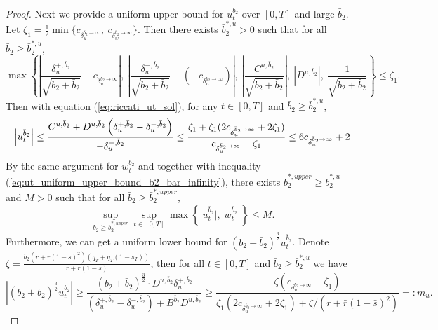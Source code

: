 \documentclass[11pt]{article}
\begin{document}
\begin{proof}
	Next we provide a uniform upper bound for $u_t^{\bar{b}_2}$ over $[0,T]$ and large $\bar{b}_2$. Let $\zeta_1 = \frac{1}{2} \min \{ c_{\delta_u^{\bar{b}_2 \to \infty}}, \  c_{\delta_w^{\bar{b}_2 \to \infty} } \}$. Then there exists $\bar{b}_2^{*,u} >0 $ such that for all $\bar{b}_2 \geq \bar{b}_2^{*,u}$,
	$$ \max\left\{ \left\vert \frac{\delta_u^{+,\bar{b}_2}}{\sqrt{b_2 + \bar{b}_2}} - c_{\delta^{\bar{b}_2 \to \infty}_u} \right\vert , \ \left\vert \frac{\delta_u^{-,\bar{b}_2}}{\sqrt{b_2 + \bar{b}_2}} - (-c_{\delta^{\bar{b}_2 \to \infty}_u})\right\vert,\    \left\vert \frac{C^{u,\bar{b}_2}}{\sqrt{b_2 + \bar{b}_2}} \right\vert, \   \left\vert D^{u,\bar{b}_2} \right\vert, \  \frac{1}{\sqrt{b_2 + \bar{b}_2}}  \right\} \leq \zeta_1. $$ 
	Then with equation (\ref{eq:riccati_ut_sol}), for any $t \in [0,T]$ and $\bar{b}_2 \geq \bar{b}_2^{*,u}$,
	\begin{equation}
		\left\vert u_t^{\bar{b}_2} \right\vert 
		\leq \frac{C^{u,\bar{b}_2}+ D^{u,\bar{b}_2} \left(\delta_u^{+,\bar{b}_2} - \delta_u^{-,\bar{b}_2} \right)}{- \delta_u^{-,\bar{b}_2}} \\
		\leq  \frac{\zeta_1 + \zeta_1 (2 c_{\delta_u^{\bar{b}_2 \to \infty}} + 2 \zeta_1)}{ c_{\delta_u^{\bar{b}_2 \to \infty}} - \zeta_1} \leq 6 c_{\delta_u^{\bar{b}_2 \to \infty}} + 2
	\label{eq:ut_uniform_upper_bound_b2_bar_infinity}
	\end{equation}
	By the same argument for $w_t^{b_2}$ and together with inequality (\ref{eq:ut_uniform_upper_bound_b2_bar_infinity}), there exists $\bar{b}_2^{*,upper} \geq \bar{b}_2^{*,u}$ and $M>0$ such that for all $\bar{b}_2 \geq \bar{b}_2^{*,upper}$, 
	\begin{equation}
	 \sup_{\bar{b}_2 \geq \bar{b}_2^{*,upper}} \sup_{t \in [0,T]} \max \left\{ \vert u_t^{\bar{b}_2}\vert, \vert w_t^{\bar{b}_2} \vert \right\} \leq M.
	 \label{eq:ut_wt_uniform_upper_bound_b2_bar_infty}
	\end{equation}
	Furthermore, we can get a uniform lower bound for $(b_2 + \bar{b}_2)^{\frac{3}{2}} u_t^{\bar{b}_2}$. Denote $\zeta = \frac{b_2 (r + \bar{r}(1-\bar{s})^2) (q_T + \bar{q}_T(1-s_T))}{r + \bar{r}(1-s)}$, then for all $t \in [0,T]$ and $\bar{b}_2 \geq \bar{b}_2^{*,u}$ we have
	\begin{equation}
		\left\vert (b_2 + \bar{b}_2)^{\frac{3}{2}} u_t^{\bar{b}_2} \right\vert \geq    \frac{ (b_2 + \bar{b}_2)^{\frac{3}{2}} \cdot D^{u,\bar{b}_2} \delta_u^{+,\bar{b}_2}}{(\delta_u^{+,\bar{b}_2} - \delta_u^{-,\bar{b}_2}) + B^{\bar{b}_2} D^{u,\bar{b}_2} } 
		\geq  \frac{\zeta (c_{\delta_u^{\bar{b}_2 \to \infty}} - \zeta_1)}{ \zeta_1 (2 c_{\delta_u^{\bar{b}_2 \to \infty}} + 2 \zeta_1) + \zeta / (r+ \bar{r}(1-\bar{s})^2) } =: m_u.
	\label{eq:ut_lower_bound_b2_bar_infty}
	\end{equation}


\end{proof}
\end{document}
